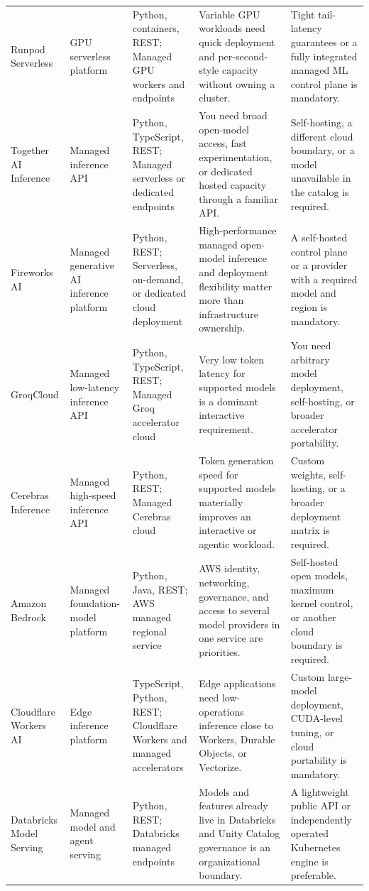 \begin{longtable}{@{}p{20mm}p{22mm}p{26mm}p{46mm}p{46mm}@{}}
Runpod Serverless & GPU serverless platform & Python, containers, REST; Managed GPU workers and endpoints & Variable GPU workloads need quick deployment and per-second-style capacity without owning a cluster. & Tight tail-latency guarantees or a fully integrated managed ML control plane is mandatory.\\
Together AI Inference & Managed inference API & Python, TypeScript, REST; Managed serverless or dedicated endpoints & You need broad open-model access, fast experimentation, or dedicated hosted capacity through a familiar API. & Self-hosting, a different cloud boundary, or a model unavailable in the catalog is required.\\
Fireworks AI & Managed generative AI inference platform & Python, REST; Serverless, on-demand, or dedicated cloud deployment & High-performance managed open-model inference and deployment flexibility matter more than infrastructure ownership. & A self-hosted control plane or a provider with a required model and region is mandatory.\\
GroqCloud & Managed low-latency inference API & Python, TypeScript, REST; Managed Groq accelerator cloud & Very low token latency for supported models is a dominant interactive requirement. & You need arbitrary model deployment, self-hosting, or broader accelerator portability.\\
Cerebras Inference & Managed high-speed inference API & Python, REST; Managed Cerebras cloud & Token generation speed for supported models materially improves an interactive or agentic workload. & Custom weights, self-hosting, or a broader deployment matrix is required.\\
Amazon Bedrock & Managed foundation-model platform & Python, Java, REST; AWS managed regional service & AWS identity, networking, governance, and access to several model providers in one service are priorities. & Self-hosted open models, maximum kernel control, or another cloud boundary is required.\\
Cloudflare Workers AI & Edge inference platform & TypeScript, Python, REST; Cloudflare Workers and managed accelerators & Edge applications need low-operations inference close to Workers, Durable Objects, or Vectorize. & Custom large-model deployment, CUDA-level tuning, or cloud portability is mandatory.\\
Databricks Model Serving & Managed model and agent serving & Python, REST; Databricks managed endpoints & Models and features already live in Databricks and Unity Catalog governance is an organizational boundary. & A lightweight public API or independently operated Kubernetes engine is preferable.\\
\bottomrule\end{longtable}
